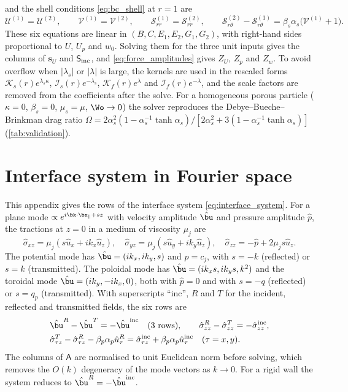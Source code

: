 and the shell conditions \eqref{eq:bc_shell} at $r=1$ are
\begin{equation*}
  \mathcal U^{(1)}=\mathcal U^{(2)},\qquad \mathcal V^{(1)}=\mathcal V^{(2)},\qquad
  \mathcal S^{(1)}_{rr}=\mathcal S^{(2)}_{rr},\qquad
  \mathcal S^{(2)}_{r\theta}-\mathcal S^{(1)}_{r\theta}=\beta_s\alpha_s\bigl(\mathcal V^{(1)}+1\bigr).
\end{equation*}
These six equations are linear in $(B,C,E_1,E_2,G_1,G_2)$, with right-hand sides proportional to $U$, $U_p$ and
$w_0$. Solving them for the three unit inputs gives the columns of $\bm s_U$ and $\mathsf S_{\rm inc}$, and
\cref{eq:force_amplitudes} gives $Z_U$, $Z_p$ and $Z_w$. To avoid overflow when $|\lambda_s|$ or $|\lambda|$ is large,
the kernels are used in the rescaled forms $\mathcal K_s(r)e^{\lambda_s\kappa}$, $\mathcal I_s(r)e^{-\lambda_s}$,
$\mathcal K_f(r)e^{\lambda}$ and $\mathcal I_f(r)e^{-\lambda}$, and the scale factors are removed from the coefficients
after the solve. For a homogeneous porous particle ($\kappa=0$, $\beta_s=0$, $\mu_s=\mu$, $\Wo\to0$) the solver
reproduces the Debye--Bueche--Brinkman drag ratio
$\Omega=2\alpha_s^2(1-\alpha_s^{-1}\tanh\alpha_s)/[2\alpha_s^2+3(1-\alpha_s^{-1}\tanh\alpha_s)]$
(\cref{tab:validation}).

\section{Interface system in Fourier space}\label{app:interface}
This appendix gives the rows of the interface system \eqref{eq:interface_system}. For a plane mode
$\propto e^{i\bk\cdot\bx_\parallel+sz}$ with velocity amplitude $\hat\bu$ and pressure amplitude $\hat p$, the tractions
at $z=0$ in a medium of viscosity $\mu_j$ are
\begin{equation*}
  \hat\sigma_{xz}=\mu_j\left(s\hat u_x+ik_x\hat u_z\right),\quad
  \hat\sigma_{yz}=\mu_j\left(s\hat u_y+ik_y\hat u_z\right),\quad
  \hat\sigma_{zz}=-\hat p+2\mu_js\hat u_z .
\end{equation*}
The potential mode has $\hat\bu=(ik_x,ik_y,s)$ and $\hat p=c_j$, with $s=-k$ (reflected) or $s=k$ (transmitted). The
poloidal mode has $\hat\bu=(ik_xs,ik_ys,k^2)$ and the toroidal mode $\hat\bu=(ik_y,-ik_x,0)$, both with $\hat p=0$ and
with $s=-q$ (reflected) or $s=q_p$ (transmitted). With superscripts ``inc'', $R$ and $T$ for the incident, reflected and
transmitted fields, the six rows are
\begin{align*}
  &\hat\bu^{R}-\hat\bu^{T}=-\hat\bu^{\rm inc}\quad(3\ \text{rows}),\qquad
  \hat\sigma^{R}_{zz}-\hat\sigma^{T}_{zz}=-\hat\sigma^{\rm inc}_{zz},\\
  &\hat\sigma^{T}_{\tau z}-\hat\sigma^{R}_{\tau z}-\beta_p\alpha_p\hat u^{R}_\tau
   =\hat\sigma^{\rm inc}_{\tau z}+\beta_p\alpha_p\hat u^{\rm inc}_\tau\quad(\tau=x,y).
\end{align*}
The columns of $\mathsf A$ are normalised to unit Euclidean norm before solving, which removes the $O(k)$ degeneracy of
the mode vectors as $k\to0$. For a rigid wall the system reduces to $\hat\bu^R=-\hat\bu^{\rm inc}$.

